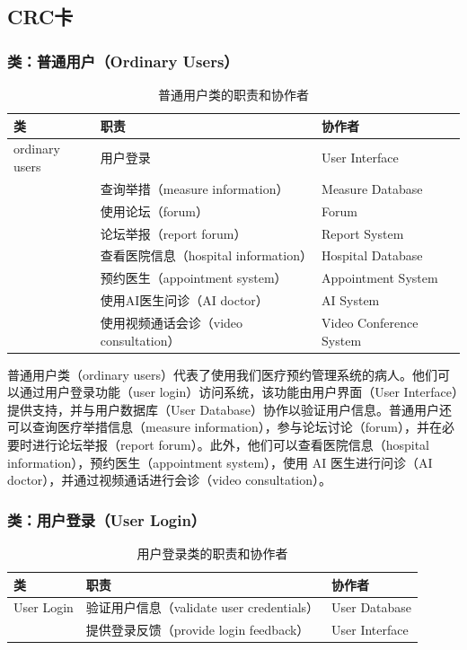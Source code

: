 \subsection{CRC卡}
\subsubsection{类：普通用户（Ordinary Users）}
\begin{table}[htbp]
	\centering
	\begin{tabular}{|l|l|l|}
		\hline
		\textbf{类} & \textbf{职责} & \textbf{协作者} \\
		\hline
		ordinary users & 用户登录 & User Interface \\
		& 查询举措（measure information） & Measure Database \\
		& 使用论坛（forum） & Forum \\
		& 论坛举报（report forum） & Report System \\
		& 查看医院信息（hospital information） & Hospital Database \\
		& 预约医生（appointment system） & Appointment System \\
		& 使用AI医生问诊（AI doctor） & AI System \\
		& 使用视频通话会诊（video consultation） & Video Conference System \\
		\hline
	\end{tabular}
	\caption{普通用户类的职责和协作者}
	\label{tab:ordinary_users}
\end{table}

普通用户类（ordinary users）代表了使用我们医疗预约管理系统的病人。他们可以通过用户登录功能（user login）访问系统，该功能由用户界面（User Interface）提供支持，并与用户数据库（User Database）协作以验证用户信息。普通用户还可以查询医疗举措信息（measure information），参与论坛讨论（forum），并在必要时进行论坛举报（report forum）。此外，他们可以查看医院信息（hospital information），预约医生（appointment system），使用 AI 医生进行问诊（AI doctor），并通过视频通话进行会诊（video consultation）。

\subsubsection{类：用户登录（User Login）}
\begin{table}[htbp]
	\centering
	\begin{tabular}{|l|l|l|}
		\hline
		\textbf{类} & \textbf{职责} & \textbf{协作者} \\
		\hline
		User Login & 验证用户信息（validate user credentials） & User Database \\
		& 提供登录反馈（provide login feedback） & User Interface \\
		\hline
	\end{tabular}
	\caption{用户登录类的职责和协作者}
	\label{tab:user_login}
\end{table}

